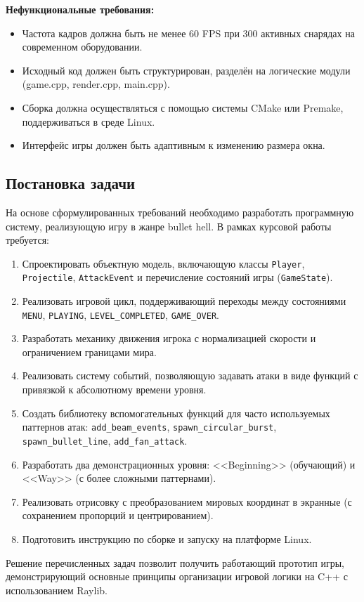 \documentclass[../main.tex]{subfiles}
\begin{document}
\textbf{Нефункциональные требования:}
\begin{itemize}
	\item Частота кадров должна быть не менее 60 FPS при 300 активных снарядах на современном оборудовании.
	\item Исходный код должен быть структурирован, разделён на логические модули (game.cpp, render.cpp, main.cpp).
	\item Сборка должна осуществляться с помощью системы CMake или Premake, поддерживаться в среде Linux.
	\item Интерфейс игры должен быть адаптивным к изменению размера окна.
\end{itemize}

\subsection{Постановка задачи}

На основе сформулированных требований необходимо разработать программную систему, реализующую игру в жанре bullet hell. В рамках курсовой работы требуется:

\begin{enumerate}
	\item Спроектировать объектную модель, включающую классы \texttt{Player}, \texttt{Projectile}, \texttt{AttackEvent} и перечисление состояний игры (\texttt{GameState}).
	\item Реализовать игровой цикл, поддерживающий переходы между состояниями \texttt{MENU}, \texttt{PLAYING}, \texttt{LEVEL\_COMPLETED}, \texttt{GAME\_OVER}.
	\item Разработать механику движения игрока с нормализацией скорости и ограничением границами мира.
	\item Реализовать систему событий, позволяющую задавать атаки в виде функций с привязкой к абсолютному времени уровня.
	\item Создать библиотеку вспомогательных функций для часто используемых паттернов атак: \texttt{add\_beam\_events}, \texttt{spawn\_circular\_burst}, \texttt{spawn\_bullet\_line}, \texttt{add\_fan\_attack}.
	\item Разработать два демонстрационных уровня: <<Beginning>> (обучающий) и <<Way>> (с более сложными паттернами).
	\item Реализовать отрисовку с преобразованием мировых координат в экранные (с сохранением пропорций и центрированием).
	\item Подготовить инструкцию по сборке и запуску на платформе Linux.
\end{enumerate}

Решение перечисленных задач позволит получить работающий прототип игры, демонстрирующий основные принципы организации игровой логики на C++ с использованием Raylib.
\end{document}
